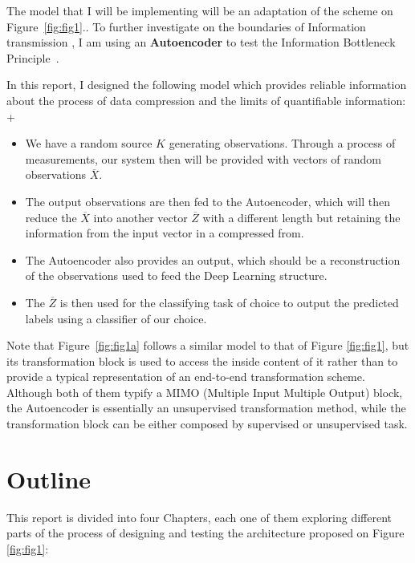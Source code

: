 The model that I will be implementing will be an adaptation of the scheme on Figure~\ref{fig:fig1}.. To further investigate on the boundaries of Information transmission , I am using an \textbf{Autoencoder} to test the Information Bottleneck Principle~\cite{Inf_Bottleneck_first}.

In this report, I designed the following model which provides reliable information about the process of data compression and the limits of quantifiable information:
+
\begin{itemize}
	\item  We have a random source $K$ generating observations. Through a process of measurements, our system then will be provided with vectors of random observations $\overline{X}$. 
	
	\item The output observations  are then fed to the Autoencoder, which will then reduce the $\overline X$ into another vector $\overline Z$ with a different length but retaining the information from the input vector in a compressed from. 
	
	\item The Autoencoder also provides an output, which should be a reconstruction of the observations used to feed the Deep Learning structure. 
	
	\item The $\overline Z$ is then used for the classifying task of choice to output the predicted labels using a classifier of our choice. 
	
\end{itemize}

Note that Figure~\ref{fig:fig1a} follows a similar model to that of Figure \ref{fig:fig1}, but its transformation block is used to access the inside content of it rather than to provide a typical representation of an end-to-end transformation scheme. Although both of them typify a MIMO (Multiple Input Multiple Output) block, the Autoencoder is essentially an unsupervised transformation method, while the transformation block can be either composed by supervised or unsupervised task.\par


\section{Outline}

This report is divided into four Chapters, each one of them exploring different parts of the process of designing and testing the architecture proposed on Figure \ref{fig:fig1}:

